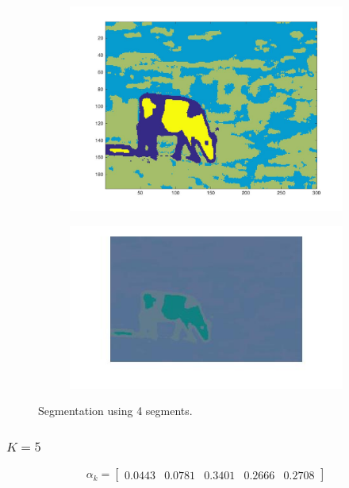 \documentclass{ethz_report}
\begin{document}
\begin{figure}[h]
    \centering
    \begin{subfigure}[b]{.5\textwidth}
        \centering
        \includegraphics[width=1\linewidth]{images/seg_K_4}
    \end{subfigure}%
    \begin{subfigure}[b]{.5\textwidth}
        \centering
        \includegraphics[width=1\linewidth]{images/seg_K_4_color}
    \end{subfigure}
    \caption{Segmentation using 4 segments.}
    \label{fig:seg_k4}
\end{figure}

\subsubsection*{$K=5$}

\begin{equation}
    \alpha_k = \begin{bmatrix}
        0.0443 & 0.0781 & 0.3401 & 0.2666 & 0.2708
    \end{bmatrix}
\end{equation}
\end{document}
